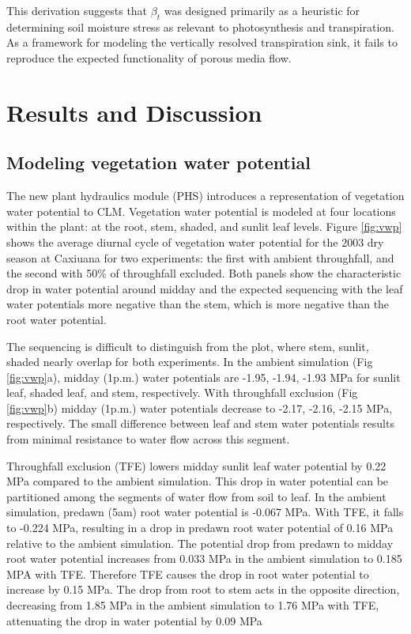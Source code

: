 \documentclass[draft,linenumbers]{agujournal}
\begin{document}
    This derivation suggests that $\beta_t$ was designed primarily as a heuristic for determining soil moisture stress
    as relevant to photosynthesis and transpiration.
    As a framework for modeling the vertically resolved transpiration sink, 
    it fails to reproduce the expected functionality of porous media flow.
    
     
    

    
\section{Results and Discussion}
\subsection{Modeling vegetation water potential}

The new plant hydraulics module (PHS) introduces a representation of vegetation water potential to CLM.
Vegetation water potential is modeled at four locations within the plant: at the root, stem, shaded, and sunlit leaf levels.
Figure \ref{fig:vwp} shows the average diurnal cycle of vegetation water potential for the 2003 dry season at Caxiuana for two experiments:
the first with ambient throughfall, and the second with 50\% of throughfall excluded. 
Both panels show the characteristic drop in water potential around midday and the expected sequencing with 
the leaf water potentials more negative than the stem, which is more negative than the root water potential.

The sequencing is difficult to distinguish from the plot, where stem, sunlit, shaded nearly overlap for both experiments. 
In the ambient simulation (Fig \ref{fig:vwp}a), midday (1p.m.) water potentials are -1.95, -1.94, -1.93 MPa 
for sunlit leaf, shaded leaf, and stem, respectively.
With throughfall exclusion (Fig \ref{fig:vwp}b) midday (1p.m.) water potentials decrease to -2.17, -2.16, -2.15 MPa, respectively.
The small difference between leaf and stem water potentials results from minimal resistance to water flow across this segment. 


Throughfall exclusion (TFE) lowers midday sunlit leaf water potential by 0.22 MPa compared to the ambient simulation.
This drop in water potential can be partitioned among the segments of water flow from soil to leaf.
In the ambient simulation, predawn (5am) root water potential is -0.067 MPa. 
With TFE, it falls to -0.224 MPa, resulting in a drop in predawn root water potential of 0.16 MPa relative to the ambient simulation. 
The potential drop from predawn to midday root water potential increases from 0.033 MPa in the ambient simulation to 0.185 MPA with TFE.
Therefore TFE causes the drop in root water potential to increase by 0.15 MPa.
The drop from root to stem acts in the opposite direction, decreasing from 1.85 MPa in the ambient simulation
to 1.76 MPa with TFE, attenuating the drop in water potential by 0.09 MPa
\end{document}
